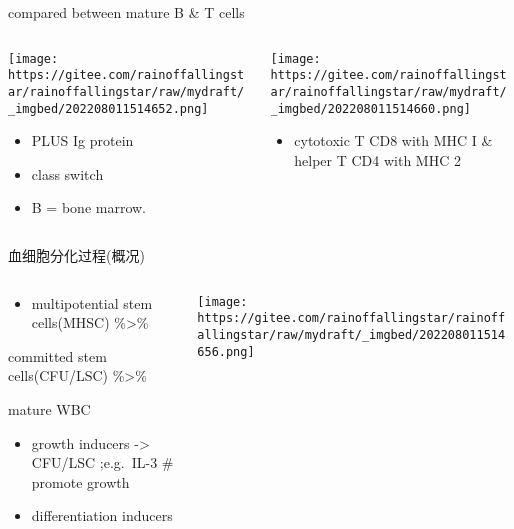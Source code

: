 \documentclass[
  ignorenonframetext,
]{beamer}
\providecommand{\tightlist}{%
  \setlength{\itemsep}{0pt}\setlength{\parskip}{0pt}}
\begin{document}
\begin{frame}
\begin{block}{compared between mature B \& T cells}
\protect\hypertarget{compared-between-mature-b-t-cells}{}
\begin{columns}[T]
\begin{column}{0.5\textwidth}
\texttt{[image: https://gitee.com/rainoffallingstar/rainoffallingstar/raw/mydraft/\_imgbed/202208011514652.png]}

\begin{itemize}
\item
  PLUS Ig protein
\item
  class switch
\item
  B = bone marrow.
\end{itemize}
\end{column}

\begin{column}{0.5\textwidth}
\texttt{[image: https://gitee.com/rainoffallingstar/rainoffallingstar/raw/mydraft/\_imgbed/202208011514660.png]}

\begin{itemize}
\tightlist
\item
  cytotoxic T CD8 with MHC I \& helper T CD4 with MHC 2
\end{itemize}
\end{column}
\end{columns}
\end{block}
\end{frame}

\begin{frame}
\begin{block}{血细胞分化过程(概况)}
\protect\hypertarget{ux8840ux7ec6ux80deux5206ux5316ux8fc7ux7a0bux6982ux51b5}{}
\begin{columns}[T]
\begin{column}{0.3\textwidth}
\begin{itemize}
\tightlist
\item
  multipotential stem cells(MHSC) \%\textgreater\%
\end{itemize}

committed stem cells(CFU/LSC) \%\textgreater\%

mature WBC

\begin{itemize}
\item
  growth inducers -\textgreater{} CFU/LSC ;e.g.~IL-3 \# promote growth
\item
  differentiation inducers
\end{itemize}
\end{column}

\begin{column}{0.7\textwidth}
\texttt{[image: https://gitee.com/rainoffallingstar/rainoffallingstar/raw/mydraft/\_imgbed/202208011514656.png]}
\end{column}
\end{columns}
\end{block}
\end{frame}
\end{document}
